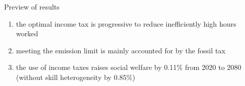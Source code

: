 \documentclass[11pt,aspectratio=169]{beamer}
\begin{document}
%	


\begin{frame}{Preview of results}
	\pause
\begin{enumerate}
	\item<+-> the \alert{optimal income tax is progressive}  to reduce inefficiently high hours worked
	\vspace{5mm}
	\item<+->  meeting the emission limit is mainly accounted for by the fossil tax
	\vspace{5mm}
	\item<+-> the use of income taxes \alert{raises social welfare by 0.11\%}   %
	from 2020 to 2080 \\ \small{(without  skill heterogeneity by 0.85\%)}
	
	\vspace{5mm}
\end{enumerate}
\end{frame}
\end{document}
